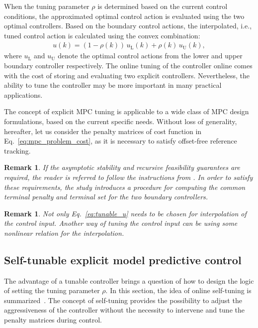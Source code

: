 \documentclass[preprint,12pt]{elsarticle}
\newtheorem{remark}[theorem]{Remark}
\begin{document}
	When the tuning parameter $\rho$ is determined based on the current control conditions, the approximated optimal control action is evaluated using the two optimal controllers. Based on the boundary control actions, the interpolated, i.e., tuned control action is calculated using the convex combination:
		\begin{eqnarray}
			\label{eq:tunable_u}
			u(k) = (1-\rho(k)) \, u_\mathrm{L}(k) + \rho(k) \, u_\mathrm{U}(k) ,
		\end{eqnarray}
	where $u_\mathrm{L}$ and $u_\mathrm{U}$ denote the optimal control actions from the lower and upper boundary controller respectively. The online tuning of the controller online comes with the cost of storing and evaluating two explicit controllers. Nevertheless, the ability to tune the controller may be more important in many practical applications.
	
	The concept of explicit MPC tuning is applicable to a wide class of MPC design formulations, based on the current specific needs. Without loss of generality, hereafter, let us consider the penalty matrices of cost function in Eq.~\eqref{eq:mpc_problem_cost}, as it is necessary to satisfy offset-free reference tracking.
	
	\begin{remark}
		If the asymptotic stability and recursive feasibility guarantees are required, the reader is referred to follow the instructions from \cite{Oravec_tunable}. In order to satisfy these requirements, the study introduces a procedure for computing the common terminal penalty and terminal set for the two boundary controllers. 
	\end{remark}

	\begin{remark}
		Not only Eq.~\eqref{eq:tunable_u} needs to be chosen for interpolation of the control input. Another way of tuning the control input can be using some nonlinear relation for the interpolation. 
	\end{remark}


	
	\subsection{Self-tunable explicit model predictive control}
	\label{sec:self_tunable}	
	The advantage of a tunable controller brings a question of how to design the logic of setting the tuning parameter $\rho$. In this section, the idea of online self-tuning is summarized~\cite{self_tunable}. The concept of self-tuning provides the possibility to adjust the aggressiveness of the controller without the necessity to intervene and tune the penalty matrices during control. 
	
\end{document}
